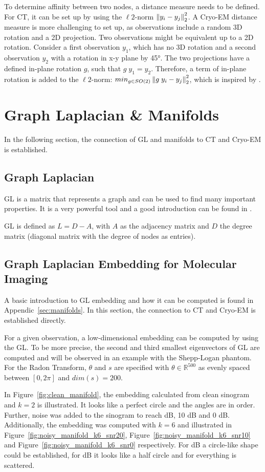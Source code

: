 To determine affinity between two nodes, a distance measure needs to be defined.
For CT, it can be set up by using the $\ell2$-norm $\left\lVert y_i - y_j\right\rVert^2_2$.
A Cryo-EM distance measure is more challenging to set up, as observations include a random 3D rotation and a 2D projection.
Two observations might be equivalent up to a 2D rotation. 
Consider a first observation $y_1$, which has no 3D rotation and 
a second observation $y_2$ with a rotation in x-y plane by 45°.
The two projections have a defined in-plane rotation $g$, such that $g \; y_1 = y_2$.
Therefore, a term of in-plane rotation is added to the $\ell2$-norm: $min_{g \in SO(2)}\left\lVert g \;y_i - y_j\right\rVert^2_2$, 
which is inspired by \cite{multiDiffusionMaps}.


\section{Graph Laplacian \& Manifolds}
In the following section, the connection of GL and manifolds to CT and Cryo-EM is established.

\subsection{Graph Laplacian}
GL is a matrix that represents a graph and can be used to find many important properties.
It is a very powerful tool and a good introduction can be found in \cite{tutorialSpectralClustering, SpectralGraphTheory}. 

GL is defined as $L = D - A$, with $A$ as the adjacency matrix and $D$ the degree matrix (diagonal matrix with the degree of nodes as entries).

\subsection{Graph Laplacian Embedding for Molecular Imaging}
A basic introduction to GL embedding and how it can be computed is found in Appendic~\ref{sec:manifolds}.
In this section, the connection to CT and Cryo-EM is established directly.

For a given observation, a low-dimensional embedding can be computed by using the GL.
To be more precise, the second and third smallest eigenvectors of GL are computed and will be observed in an example 
with the Shepp-Logan phantom.
For the Radon Transform, $\theta$ and $s$ are specified with $\theta \in \mathbb{R}^{500}$ as evenly spaced
between $[0, 2 \pi]$ and $dim(s) = 200$. 

In Figure~\ref{fig:clean_manifold}, the embedding calculated from clean sinogram and $k=2$ is illustrated.
It looks like a perfect circle and the angles are in order. 
Further, noise was added to the sinogram to reach  dB, 10 dB and 0 dB. 
Additionally, the embedding was computed with $k=6$ and illustrated in Figure~\ref{fig:noisy_manifold_k6_snr20},
Figure~\ref{fig:noisy_manifold_k6_snr10} and Figure~\ref{fig:noisy_manifold_k6_snr0} respectively.
For  dB a circle-like shape could be established, for  dB it looks like a half circle and for \snry
everything is scattered. 

